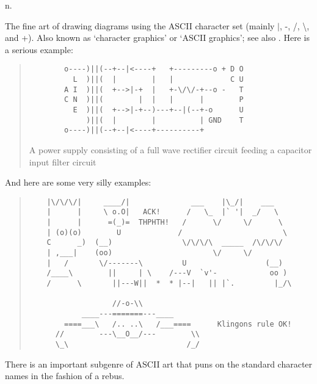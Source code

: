  n.

The fine art of drawing diagrams using the ASCII character set (mainly $\left|\right.$, -, /, \textbackslash, and +). Also known as
`character graphics' or `ASCII graphics'; see also . Here is a serious example:

\begin{figure*}
    \begin{quote}
        \begin{verbatim}
        o----)||(--+--|<----+   +---------o + D O
          L  )||(  |        |   |             C U
        A I  )||(  +-->|-+  |   +-\/\/-+--o -   T
        C N  )||(        |  |   |      |        P
          E  )||(  +-->|-+--)---+--|(--+-o      U
             )||(  |        |          | GND    T
        o----)||(--+--|<----+----------+
        \end{verbatim}

        A power supply consisting of a full wave rectifier circuit feeding a capacitor input filter circuit
    \end{quote}
\end{figure*}

And here are some very silly examples:

\begin{figure*}
    \begin{quote}
        \begin{verbatim}
    |\/\/\/|     ____/|              ___    |\_/|    ___
    |      |     \ o.O|   ACK!      /   \_  |` '|  _/   \
    |      |      =(_)=  THPHTH!   /      \/     \/      \
    | (o)(o)        U             /                       \
    C      _)  (__)                \/\/\/\  _____  /\/\/\/
    | ,___|    (oo)                       \/     \/
    |   /       \/-------\         U                  (__)
    /____\        ||     | \    /---V  `v'-            oo )
    /      \       ||---W||  *  * |--|   || |`.         |_/\

                   //-o-\\
            ____---=======---____
        ====___\   /.. ..\   /___====      Klingons rule OK!
      //        ---\__O__/---        \\
      \_\                           /_/
        \end{verbatim}
    \end{quote}
\end{figure*}

There is an important subgenre of ASCII art that puns on the standard character names in the fashion of a rebus.

